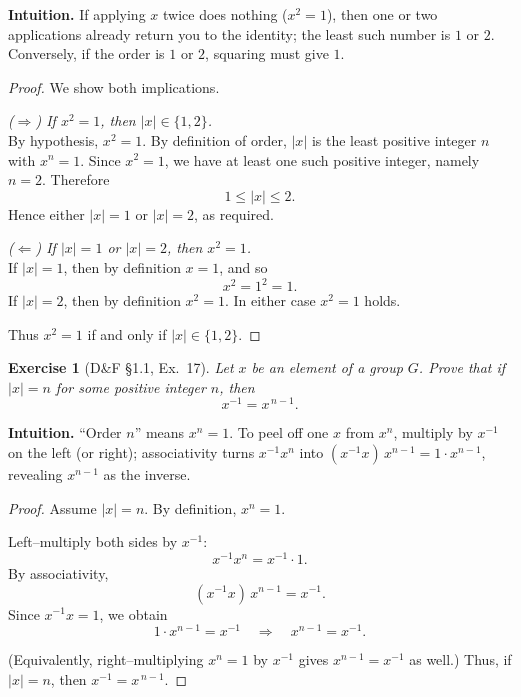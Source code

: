 \documentclass[12pt]{article}
\newtheorem{exercise}[theorem]{Exercise}
\theoremstyle{definition}
\begin{document}
\dotfill

\noindent
\textbf{Intuition.}
If applying $x$ twice does nothing ($x^2=1$), then one or two applications already return you to the identity;
the least such number is $1$ or $2$. Conversely, if the order is $1$ or $2$, squaring must give $1$.

\dotfill

\begin{proof}
We show both implications.

\dotfill

\noindent\emph{($\Rightarrow$) If $x^2=1$, then $|x|\in\{1,2\}$.}\\

\noindent
By hypothesis, $x^2=1$. By definition of order, $|x|$ is the least positive integer $n$ with $x^n=1$.
Since $x^2=1$, we have at least one such positive integer, namely $n=2$. Therefore
\[
1\le |x|\le 2.
\]
Hence either $|x|=1$ or $|x|=2$, as required.

\dotfill

\noindent\emph{($\Leftarrow$) If $|x|=1$ or $|x|=2$, then $x^2=1$.}\\

\noindent
If $|x|=1$, then by definition $x=1$, and so
\[
x^2=1^2=1.
\]
If $|x|=2$, then by definition $x^2=1$. In either case $x^2=1$ holds.

\dotfill

\noindent
Thus $x^2=1$ if and only if $|x|\in\{1,2\}$.
\end{proof}

\newpage

\begin{exercise}[D\&F §1.1, Ex.~17]
Let $x$ be an element of a group $G$. Prove that if $|x|=n$ for some positive integer $n$, then
\[
x^{-1}=x^{\,n-1}.
\]
\end{exercise}

\dotfill

\noindent
\textbf{Intuition.}
“Order $n$” means $x^n=1$. To peel off one $x$ from $x^n$, multiply by $x^{-1}$ on the left (or right);
associativity turns $x^{-1}x^n$ into $(x^{-1}x)\,x^{n-1}=1\cdot x^{n-1}$, revealing $x^{n-1}$ as the inverse.

\dotfill

\begin{proof}
Assume $|x|=n$. By definition, $x^n=1$.

Left–multiply both sides by $x^{-1}$:
\[
x^{-1}x^n = x^{-1}\cdot 1.
\]
By associativity,
\[
(x^{-1}x)\,x^{n-1} = x^{-1}.
\]
Since $x^{-1}x=1$, we obtain
\[
1\cdot x^{n-1}=x^{-1} \quad\Longrightarrow\quad x^{n-1}=x^{-1}.
\]

(Equivalently, right–multiplying $x^n=1$ by $x^{-1}$ gives $x^{n-1}=x^{-1}$ as well.)
Thus, if $|x|=n$, then $x^{-1}=x^{\,n-1}$.
\end{proof}
\end{document}
